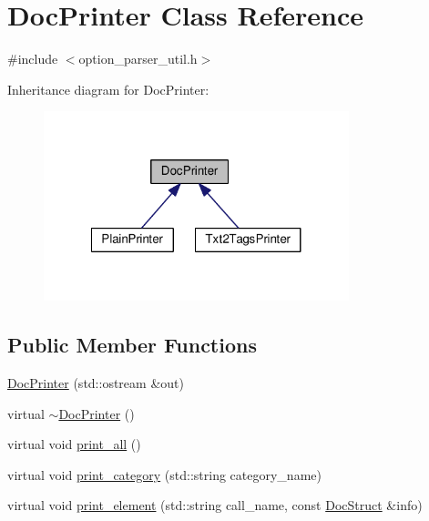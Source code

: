 \hypertarget{classDocPrinter}{\section{Doc\-Printer Class Reference}
\label{classDocPrinter}
}


{\ttfamily \#include $<$option\-\_\-parser\-\_\-util.\-h$>$}



Inheritance diagram for Doc\-Printer\-:
\nopagebreak
\begin{figure}[H]
\begin{center}
\leavevmode
\includegraphics[width=251pt]{classDocPrinter__inherit__graph}
\end{center}
\end{figure}
\subsection*{Public Member Functions}
\begin{DoxyCompactItemize}
\item 
\hyperlink{classDocPrinter_af6d4306e2dc03bc5151adf76e03e1f15}{Doc\-Printer} (std\-::ostream \&out)
\item 
virtual \hyperlink{classDocPrinter_aba059ba132eb4143d2454e30e8bec9c5}{$\sim$\-Doc\-Printer} ()
\item 
virtual void \hyperlink{classDocPrinter_a7da00e32e5758f07b5a1b6cd5d4e9824}{print\-\_\-all} ()
\item 
virtual void \hyperlink{classDocPrinter_a70234bd56a73aa917edf170be8415ce6}{print\-\_\-category} (std\-::string category\-\_\-name)
\item 
virtual void \hyperlink{classDocPrinter_a0253343f6a7ffef9de4c915d2091d5db}{print\-\_\-element} (std\-::string call\-\_\-name, const \hyperlink{structDocStruct}{Doc\-Struct} \&info)
\end{DoxyCompactItemize}
